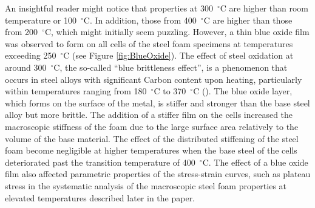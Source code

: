 \documentclass[review]{elsarticle}
\begin{document}
An insightful reader might notice that properties at 300~$^{\circ}\mathrm{C}$ are higher than room temperature or 100~$^{\circ}\mathrm{C}$. In addition, those from 400~$^{\circ}\mathrm{C}$ are higher than those from 200~$^{\circ}\mathrm{C}$, which might initially seem puzzling. However, a thin blue oxide film was observed to form on all cells of the steel foam specimens at temperatures exceeding 250~$^{\circ}\mathrm{C}$ (see Figure \ref{fig:BlueOxide}). The effect of steel oxidation at around 300~$^{\circ}\mathrm{C}$, the so-called ``blue brittleness effect'', is a phenomenon that occurs in steel alloys with significant Carbon content upon heating, particularly within temperatures ranging from 180~$^{\circ}\mathrm{C}$ to 370~$^{\circ}\mathrm{C}$ (\cite{XiongandLiew2016}). The blue oxide layer, which forms on the surface of the metal, is stiffer and stronger than the base steel alloy but more brittle. The addition of a stiffer film on the cells increased the macroscopic stiffness of the foam due to the large surface area relatively to the volume of the base material. The effect of the distributed stiffening of the steel foam become negligible at higher temperatures when the base steel of the cells deteriorated past the transition temperature of 400~$^{\circ}\mathrm{C}$. The effect of a blue oxide film also affected parametric properties of the stress-strain curves, such as plateau stress in the systematic analysis of the macroscopic steel foam properties at elevated temperatures described later in the paper.
\end{document}
